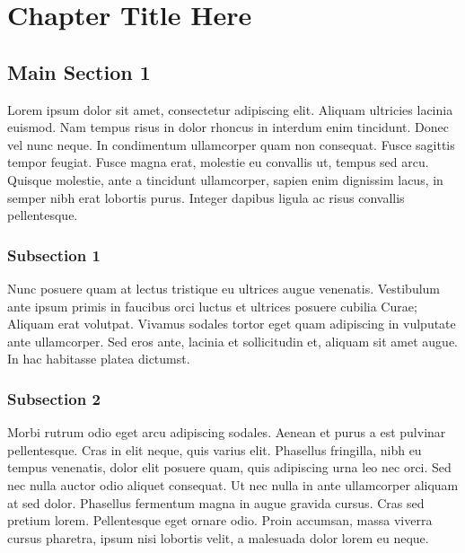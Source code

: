 
\chapter{Chapter Title Here} %

\label{ChapterX} %


\section{Main Section 1}

Lorem ipsum dolor sit amet, consectetur adipiscing elit. Aliquam ultricies lacinia euismod. Nam tempus risus in dolor rhoncus in interdum enim tincidunt. Donec vel nunc neque. In condimentum ullamcorper quam non consequat. Fusce sagittis tempor feugiat. Fusce magna erat, molestie eu convallis ut, tempus sed arcu. Quisque molestie, ante a tincidunt ullamcorper, sapien enim dignissim lacus, in semper nibh erat lobortis purus. Integer dapibus ligula ac risus convallis pellentesque.

\subsection{Subsection 1}

Nunc posuere quam at lectus tristique eu ultrices augue venenatis. Vestibulum ante ipsum primis in faucibus orci luctus et ultrices posuere cubilia Curae; Aliquam erat volutpat. Vivamus sodales tortor eget quam adipiscing in vulputate ante ullamcorper. Sed eros ante, lacinia et sollicitudin et, aliquam sit amet augue. In hac habitasse platea dictumst.


\subsection{Subsection 2}
Morbi rutrum odio eget arcu adipiscing sodales. Aenean et purus a est pulvinar pellentesque. Cras in elit neque, quis varius elit. Phasellus fringilla, nibh eu tempus venenatis, dolor elit posuere quam, quis adipiscing urna leo nec orci. Sed nec nulla auctor odio aliquet consequat. Ut nec nulla in ante ullamcorper aliquam at sed dolor. Phasellus fermentum magna in augue gravida cursus. Cras sed pretium lorem. Pellentesque eget ornare odio. Proin accumsan, massa viverra cursus pharetra, ipsum nisi lobortis velit, a malesuada dolor lorem eu neque.

